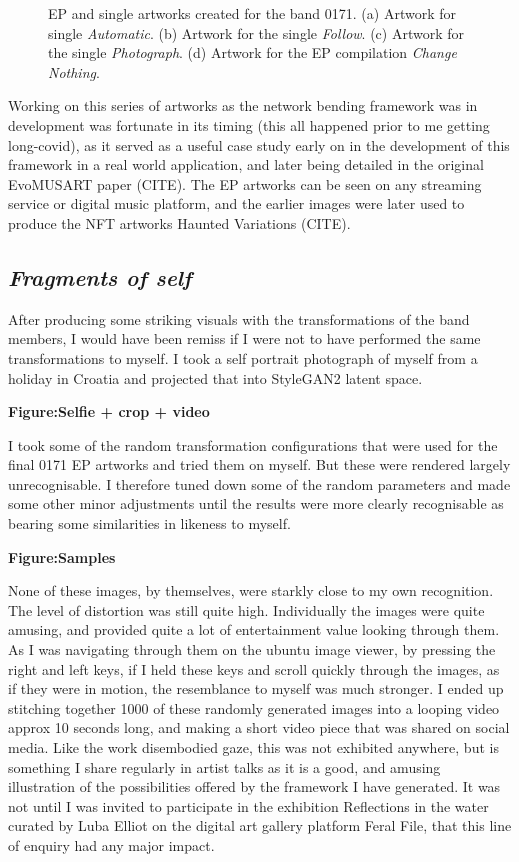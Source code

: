 \begin{figure}[!htbp]
    \caption{EP and single artworks created for the band 0171. (a) Artwork for single \textit{Automatic}. (b) Artwork for the single \textit{Follow}. (c) Artwork for the single \textit{Photograph}. (d) Artwork for the EP compilation \textit{Change Nothing}.}
    \label{fig:c7:0171-EP}
 \end{figure}

Working on this series of artworks as the network bending framework was in development was fortunate in its timing (this all happened prior to me getting long-covid), as it served as a useful case study early on in the development of this framework in a real world application, and later being detailed in the original EvoMUSART paper (CITE). 
The EP artworks can be seen on any streaming service or digital music platform, and the earlier images were later used to produce the NFT artworks Haunted Variations (CITE). 

\subsection{\textit{Fragments of self}}
\label{c6:subsubsec:fragments}

After producing some striking visuals with the transformations of the band members, I would have been remiss if I were not to have performed the same transformations to myself. 
I took a self portrait photograph of myself from a holiday in Croatia and projected that into StyleGAN2 latent space. 

\textbf{Figure:Selfie + crop + video}

I took some of the random transformation configurations that were used for the final 0171 EP artworks and tried them on myself. But these were rendered largely unrecognisable. 
I therefore tuned down some of the random parameters and made some other minor adjustments until the results were more clearly recognisable as bearing some similarities in likeness to myself.

\textbf{Figure:Samples}

None of these images, by themselves, were starkly close to my own recognition. 
The level of distortion was still quite high.
Individually the images were quite amusing, and provided quite a lot of entertainment value looking through them. 
As I was navigating through them on the ubuntu image viewer, by pressing the right and left keys, if I held these keys and scroll quickly through the images, as if they were in motion, the resemblance to myself was much stronger. I ended up stitching together 1000 of these randomly generated images into a looping video approx 10 seconds long, and making a short video piece that was shared on social media. 
Like the work disembodied gaze, this was not exhibited anywhere, but is something I share regularly in artist talks as it is a good, and amusing illustration of the possibilities offered by the framework I have generated. 
It was not until I was invited to participate in the exhibition Reflections in the water curated by Luba Elliot on the digital art gallery platform Feral File, that this line of enquiry had any major impact. 

